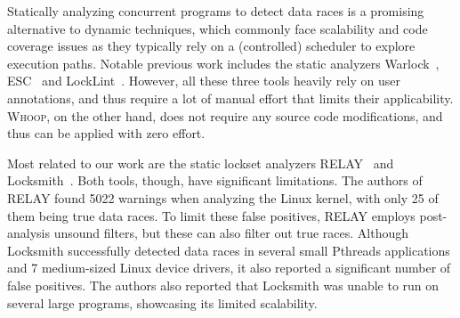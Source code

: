 Statically analyzing concurrent programs to detect data races is a promising alternative to dynamic techniques, which commonly face scalability and code coverage issues as they typically rely on a (controlled) scheduler to explore execution paths. Notable previous work includes the static analyzers Warlock~\cite{sterling1993warlock}, ESC~\cite{detlefs1998extended} and LockLint~\cite{oracle2010locklint}. However, all these three tools heavily rely on user annotations, and thus require a lot of manual effort that limits their applicability. \textsc{Whoop}, on the other hand, does not require any source code modifications, and thus can be applied with zero effort.

Most related to our work are the static lockset analyzers RELAY~\cite{voung2007relay} and Locksmith~\cite{pratikakis2006locksmith}. Both tools, though, have significant limitations. The authors of RELAY found 5022 warnings when analyzing the Linux kernel, with only 25 of them being true data races. To limit these false positives, RELAY employs post-analysis unsound filters, but these can also filter out true races. Although Locksmith successfully detected data races in several small Pthreads applications and 7 medium-sized Linux device drivers, it also reported a significant number of false positives. The authors also reported that Locksmith was unable to run on several large programs, showcasing its limited scalability.